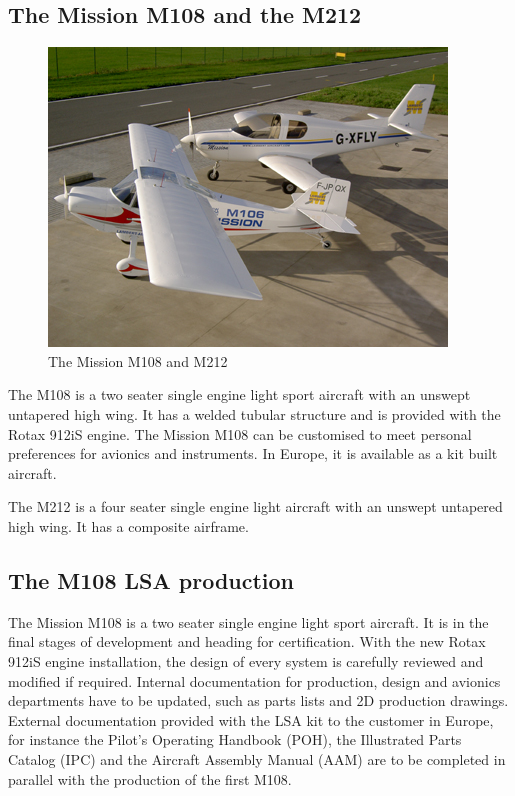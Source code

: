 \documentclass[11pt,a4paper]{article}
\begin{document}
\subsection{The Mission M108 and the M212}
\begin{figure}[ht!]
	\begin{center}
		\includegraphics[trim = 0cm 1cm 0cm 1cm,clip]{pics/PIC003.jpg}
		\caption{The Mission M108 and M212}
		\label{fig:PIC003}
	\end{center}
\end{figure}

The M108 is a two seater single engine light sport aircraft with an unswept untapered high wing. It has a welded tubular structure and is provided with the Rotax 912iS engine. The Mission M108 can be customised to meet personal preferences for avionics and instruments. In Europe, it is available as a kit built aircraft.

\bigskip

The M212 is a four seater single engine light aircraft with an unswept untapered high wing. It has a composite airframe.

\subsection{The M108 LSA production}
The Mission M108 is a two seater single engine light sport aircraft. It is in the final stages of development and heading for certification. With the new Rotax 912iS engine installation, the design of every system is carefully reviewed and modified if required. Internal documentation for production, design and avionics departments have to be updated, such as parts lists and 2D production drawings. External documentation provided with the LSA kit to the customer in Europe, for instance the Pilot's Operating Handbook (POH), the Illustrated Parts Catalog (IPC) and the Aircraft Assembly Manual (AAM) are to be completed in parallel with the production of the first M108.
\end{document}
